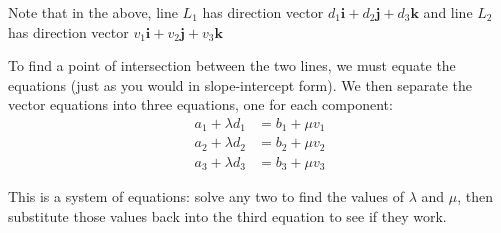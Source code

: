 \documentclass[
	11pt, %
	fleqn, %
	a4paper, %
]{../../styles/LegrandOrangeBook}
\begin{document}
Note that in the above, line $L_1$ has direction vector $d_1\mathbf{i} + d_2\mathbf{j} + d_3\mathbf{k}$ and line $L_2$ has direction vector $v_1\mathbf{i} + v_2\mathbf{j} + v_3\mathbf{k}$

To find a point of intersection between the two lines, we must equate the equations (just as you would in slope-intercept form). We then separate the vector equations into three equations, one for each component:
\begin{align*}
	a_1 + \lambda d_1 &= b_1 + \mu v_1 \\
	a_2 + \lambda d_2 &= b_2 + \mu v_2 \\
	a_3 + \lambda d_3 &= b_3 + \mu v_3
\end{align*}

This is a system of equations: solve any two to find the values of $\lambda$ and $\mu$, then substitute those values back into the third equation to see if they work.

\end{document}
